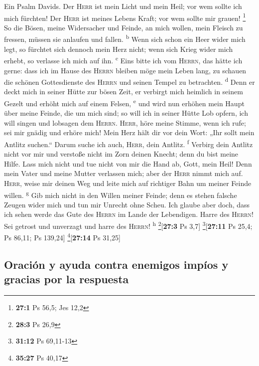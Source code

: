  Ein Psalm Davids. Der \textsc{Herr} ist mein Licht und
mein Heil; vor wem sollte ich mich fürchten! Der \textsc{Herr} ist
meines Lebens Kraft; vor wem sollte mir grauen! \footnote{\textbf{27:1}
  Ps 56,5; Jes 12,2}  So die Bösen, meine Widersacher und
Feinde, an mich wollen, mein Fleisch zu fressen, müssen sie anlaufen und
fallen. \textsuperscript{b}  Wenn sich schon ein Heer
wider mich legt, so fürchtet sich dennoch mein Herz nicht; wenn sich
Krieg wider mich erhebt, so verlasse ich mich auf ihn.
\textsuperscript{c}  Eins bitte ich vom \textsc{Herrn},
das hätte ich gerne: dass ich im Hause des \textsc{Herrn} bleiben möge
mein Leben lang, zu schauen die schönen Gottesdienste des \textsc{Herrn}
und seinen Tempel zu betrachten. \textsuperscript{d}  Denn
er deckt mich in seiner Hütte zur bösen Zeit, er verbirgt mich heimlich
in seinem Gezelt und erhöht mich auf einem Felsen, \textsuperscript{e}
 und wird nun erhöhen mein Haupt über meine Feinde, die um
mich sind; so will ich in seiner Hütte Lob opfern, ich will singen und
lobsagen dem \textsc{Herrn}.  \textsc{Herr}, höre meine
Stimme, wenn ich rufe; sei mir gnädig und erhöre mich! 
Mein Herz hält dir vor dein Wort: „Ihr sollt mein Antlitz suchen.``
Darum suche ich auch, \textsc{Herr}, dein Antlitz. \textsuperscript{f}
 Verbirg dein Antlitz nicht vor mir und verstoße nicht im
Zorn deinen Knecht; denn du bist meine Hilfe. Lass mich nicht und tue
nicht von mir die Hand ab, Gott, mein Heil!  Denn mein
Vater und meine Mutter verlassen mich; aber der \textsc{Herr} nimmt mich
auf.  \textsc{Herr}, weise mir deinen Weg und leite mich
auf richtiger Bahn um meiner Feinde willen. \textsuperscript{g}
 Gib mich nicht in den Willen meiner Feinde; denn es
stehen falsche Zeugen wider mich und tun mir Unrecht ohne Scheu.
 Ich glaube aber doch, dass ich sehen werde das Gute des
\textsc{Herrn} im Lande der Lebendigen.  Harre des
\textsc{Herrn}! Sei getrost und unverzagt und harre des \textsc{Herrn}!
\textsuperscript{h} \footnote{\textbf{28:3} Ps 26,9}{[}\textbf{27:3} Ps
3,7{]} \footnote{\textbf{31:12} Ps 69,11-13}{[}\textbf{27:11} Ps 25,4;
Ps 86,11; Ps 139,24{]} \footnote{\textbf{35:27} Ps 40,17}{[}\textbf{27:14}
Ps 31,25{]}

\hypertarget{oraciuxf3n-y-ayuda-contra-enemigos-impuxedos-y-gracias-por-la-respuesta}{%
\subsection{Oración y ayuda contra enemigos impíos y gracias por la
respuesta}\label{oraciuxf3n-y-ayuda-contra-enemigos-impuxedos-y-gracias-por-la-respuesta}}

